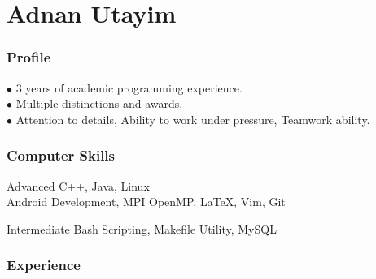 \documentclass{tccv}
\begin{document}
\part{Adnan Utayim}


\section{Profile}
$\bullet$ 3 years of academic programming experience. \\
$\bullet$ Multiple distinctions and awards. \\
$\bullet$ Attention to details, Ability to work under pressure, Teamwork ability.


\section{Computer Skills}

\begin{factlist}

\item{Advanced}
     {C++, Java, Linux \\Android Development, MPI OpenMP, \LaTeX, Vim, Git}


\item{Intermediate}
     {Bash Scripting, Makefile Utility, MySQL}

\end{factlist}


\section{Experience}
\end{document}
